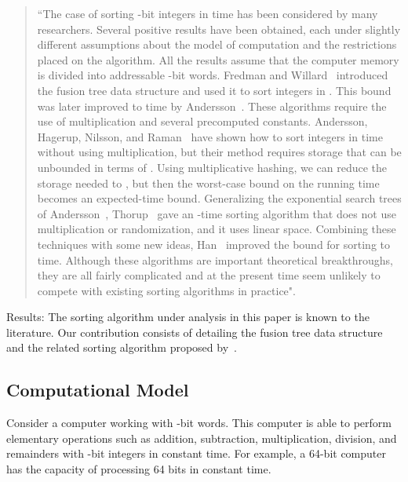 \documentclass[11pt]{article}
\begin{document}
\begin{quote}
``The case of sorting  -bit integers in  time has been considered by many researchers. Several positive results have been obtained, each under slightly different assumptions about the model of computation and the restrictions placed on the algorithm. All the results assume that the computer memory is divided into addressable -bit words. Fredman and Willard~\cite{fredman} introduced the fusion tree data structure and used it to sort  integers in . This bound was later improved to  time by Andersson~\cite{arne1}. These algorithms require the use of multiplication and several precomputed constants. Andersson, Hagerup, Nilsson, and Raman~\cite{arne2} have shown how to sort  integers in  time without using multiplication, but their method requires storage that can be unbounded in terms of . Using multiplicative hashing, we can reduce the storage needed to , but then the   worst-case bound on the running time becomes an expected-time bound. Generalizing the exponential search trees of Andersson~\cite{arne1}, Thorup~\cite{thorup} gave an -time sorting algorithm that does not use multiplication or randomization, and it uses linear space. Combining these techniques with some new ideas, 
Han~\cite{han} improved the bound for sorting to  time. Although these algorithms are important theoretical breakthroughs, they are all fairly complicated and at the present time seem unlikely to compete with existing sorting algorithms in practice".
\end{quote}


Results: The sorting algorithm  under analysis in this paper is known to the literature. Our contribution consists of detailing the fusion tree data structure and the related sorting algorithm  proposed 
by~\cite{fredman}. 







\subsection{Computational Model}


Consider a computer working with -bit words. This computer is able to perform elementary operations such as addition, subtraction, multiplication, division, and remainders with -bit integers in constant time. For example, a 64-bit computer has the capacity of processing 64 bits in constant time.
\end{document}
